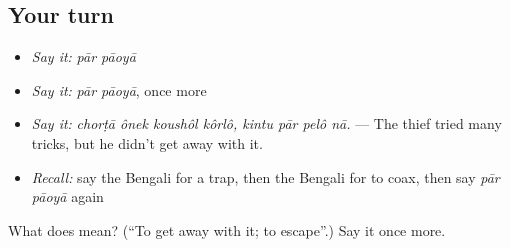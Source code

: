 \subsection*{Your turn}
\begin{itemize}
\raggedright
  \item \emph{Say it:} \emph{pār pāoyā}
  \item \emph{Say it:} \emph{pār pāoyā}, once more
  \item \emph{Say it:} \emph{chorṭā ônek koushôl kôrlô, kintu pār pelô nā.} — The thief tried many tricks, but he didn't get away with it.
  \item \emph{Recall:} say the Bengali for a trap, then the Bengali for to coax, then say \emph{pār pāoyā} again
\end{itemize}

\begin{tcolorbox}[breakable,colback=teal!4,colframe=teal!35!black,title={Before you move on}]
What does   mean? (\textquotedblleft{}To get away with it; to escape\textquotedblright{}.) Say it once more.
\end{tcolorbox}
